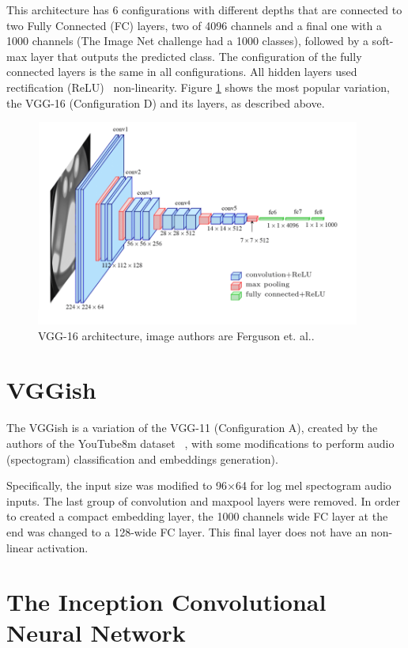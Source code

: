 This architecture has 6 configurations with different depths that are connected to two Fully Connected (FC) layers, two of 4096 channels and a final one with a 1000 channels (The Image Net challenge had a 1000 classes), followed by a soft-max layer that outputs the predicted class.
The configuration of the fully connected layers is the same in all configurations. All hidden layers used rectification (ReLU)~\cite{krizhevsky2012relu} non-linearity. Figure \ref{fig:vgg16} shows the most popular variation, the VGG-16 (Configuration D) and its layers, as described above.

\begin{figure}[!ht]
    \centering
    \includegraphics[width=0.95\textwidth]{img/vgg16.png}
    \caption{VGG-16 architecture, image authors are Ferguson et. al.\cite{ferguson2017vggimage}.}
    \label{fig:vgg16}
\end{figure}

\section{VGGish}\label{sec:VGGish}
The VGGish is a variation of the VGG-11 (Configuration A), created by the authors of the YouTube8m dataset ~\cite{abu2016youtube}, with some modifications to perform audio (spectogram) classification and embeddings generation).

Specifically, the input size was modified to 96$\times$64 for log mel spectogram audio inputs. The last group of convolution and maxpool layers were removed. In order to created a compact embedding layer, the 1000 channels wide FC layer at the end was changed to a 128-wide FC layer. This final layer does not have an non-linear activation.

\section{The Inception Convolutional Neural Network}\label{sec:Inception}

